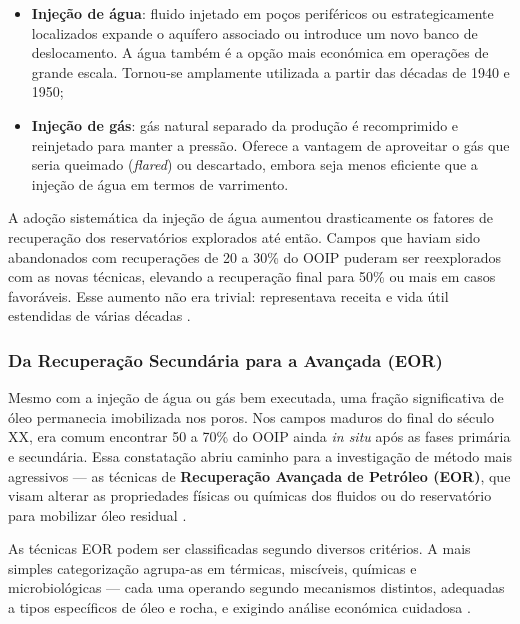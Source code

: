 \documentclass[
  12pt,
  a4paper,
  oneside,
  brazilian,
  sumario=tradicional
]{abntex2}
\begin{document}
\begin{itemize}
  \item \textbf{Injeção de água}: fluido injetado em poços periféricos
    ou estrategicamente localizados expande o aquífero associado ou
    introduce um novo banco de deslocamento. A água também é a opção
    mais económica em operações de grande escala. Tornou-se amplamente
    utilizada a partir das décadas de 1940 e 1950;
  \item \textbf{Injeção de gás}: gás natural separado da produção é
    recomprimido e reinjetado para manter a pressão. Oferece a vantagem
    de aproveitar o gás que seria queimado (\textit{flared}) ou descartado,
    embora seja menos eficiente que a injeção de água em termos de
    varrimento.
\end{itemize}

A adoção sistemática da injeção de água aumentou drasticamente os
fatores de recuperação dos reservatórios explorados até então. Campos
que haviam sido abandonados com recuperações de 20 a 30\% do OOIP
puderam ser reexplorados com as novas técnicas, elevando a recuperação
final para 50\% ou mais em casos favoráveis. Esse aumento não era
trivial: representava receita e vida útil estendidas de várias décadas \cite{ahmed2010}.

\subsubsection{Da Recuperação Secundária para a Avançada (EOR)}

Mesmo com a injeção de água ou gás bem executada, uma fração significativa
de óleo permanecia imobilizada nos poros. Nos campos maduros do final
do século XX, era comum encontrar 50 a 70\% do OOIP ainda \textit{in
situ} após as fases primária e secundária. Essa constatação abriu caminho
para a investigação de método mais agressivos — as técnicas de
\textbf{Recuperação Avançada de Petróleo (EOR)}, que visam alterar
as propriedades físicas ou químicas dos fluidos ou do reservatório
para mobilizar óleo residual \cite{lake2007}.

As técnicas EOR podem ser classificadas segundo diversos critérios. A
mais simples categorização agrupa-as em térmicas, miscíveis, químicas
e microbiológicas — cada uma operando segundo mecanismos distintos,
adequadas a tipos específicos de óleo e rocha, e exigindo análise
económica cuidadosa \cite{ahmed2010, terry2015}.
\end{document}
